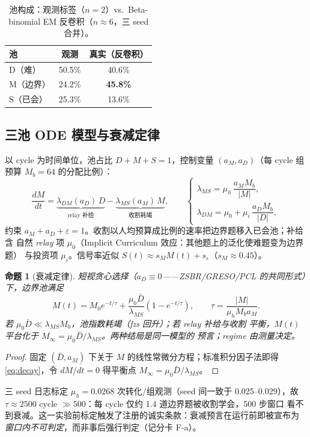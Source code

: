 \documentclass[11pt]{article}
\newtheorem{proposition}[theorem]{命题}
\theoremstyle{definition}
\begin{document}
\begin{table}[t]
\centering\small
\caption{池构成：观测标签（$n{=}2$）vs.\ Beta-binomial EM 反卷积（$n{\approx}6$，三
seed 合并）。}
\label{tab:deconv}
\begin{tabular}{@{}lcc@{}}
\toprule
池 & 观测 & 真实（反卷积） \\
\midrule
D（难） & 50.5\% & 40.6\% \\
M（边界） & 24.2\% & \textbf{45.8\%} \\
S（已会） & 25.3\% & 13.6\% \\
\bottomrule
\end{tabular}
\end{table}

\subsection{三池 ODE 模型与衰减定律}\label{sec:l3-ode}
以 cycle 为时间单位，池占比 $D{+}M{+}S{=}1$，控制变量 $(a_M,a_D)$（每 cycle 组预算
$M_b{=}64$ 的分配比例）：
\begin{equation}\label{eq:ode}
\frac{dM}{dt} = \underbrace{\lambda_{DM}(a_D)\,D}_{\text{relay 补给}}
- \underbrace{\lambda_{MS}(a_M)\,M}_{\text{收割耗竭}},\qquad
\begin{cases}
\lambda_{MS} = \mu_h\,\dfrac{a_M M_b}{|M|},\\[1.2ex]
\lambda_{DM} = \mu_0 + \mu_i\,\dfrac{a_D M_b}{|D|},
\end{cases}
\end{equation}
约束 $a_M+a_D+\varepsilon=1$。收割以人均预算成比例的速率把边界题移入已会池；补给含
自然 \emph{relay} 项 $\mu_0$（Implicit Curriculum 效应：其他题上的泛化使难题变为边界题）
与投资项 $\mu_i$。信号率近似 $S(t)\approx s_M M(t)+s_\varepsilon$（$s_M\approx0.45$）。

\begin{proposition}[衰减定律]\label{prop:decay}
短视贪心选择（$a_D\equiv0$——ZSBR/GRESO/PCL 的共同形式）下，边界池满足
\begin{equation}\label{eq:decay}
M(t) = M_0 e^{-t/\tau} + \frac{\mu_0 \bar D}{\lambda_{MS}}\left(1-e^{-t/\tau}\right),
\qquad \tau = \frac{|M|}{\mu_h M_b a_M}.
\end{equation}
若 $\mu_0 \bar D \ll \lambda_{MS} M_0$，池指数耗竭（fzs 回升）；若 relay 补给与收割
平衡，$M(t)$ 平台化于 $M_\infty=\mu_0\bar D/\lambda_{MS}$。\emph{两种结局是同一模型的
预言}；regime 由测量决定。
\end{proposition}
\begin{proof}
固定 $(\bar D, a_M)$ 下关于 $M$ 的线性常微分方程；标准积分因子法即得
\eqref{eq:decay}，令 $dM/dt=0$ 得平衡点 $M_\infty=\mu_0\bar D/\lambda_{MS}$。
\end{proof}
三 seed 日志标定 $\mu_h{=}0.0268$ 次转化/组观测（seed 间一致于 0.025--0.029），故
$\tau\approx2500$ cycle $\gg500$：每 cycle 仅约 1.4 道边界题被收割学会，500 步窗口
看不到衰减。这一实验前标定触发了注册的诚实条款：衰减预言在运行前即被宣布为
\emph{窗口内不可判定}，而非事后强行判定（记分卡 F-a）。
\end{document}
